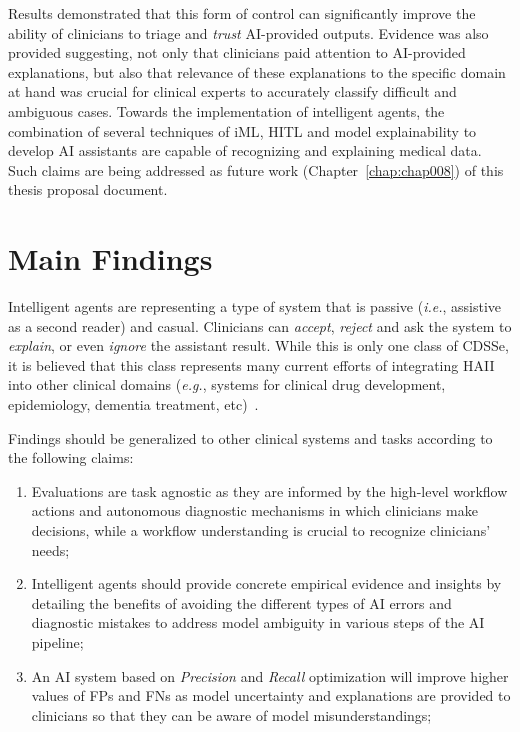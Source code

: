 Results demonstrated that this form of control can significantly improve the ability of clinicians to triage and {\it trust} \ac{AI}-provided outputs.
Evidence was also provided suggesting, not only that clinicians paid attention to \ac{AI}-provided explanations, but also that relevance of these explanations to the specific domain at hand was crucial for clinical experts to accurately classify difficult and ambiguous cases.
Towards the implementation of intelligent agents, the combination of several techniques of \ac{iML}, \ac{HITL} and model explainability to develop \ac{AI} assistants are capable of recognizing and explaining medical data.
Such claims are being addressed as future work (Chapter~\ref{chap:chap008}) of this thesis proposal document.

\section{Main Findings}
\label{sec:sec007003}

Intelligent agents are representing a type of system that is passive ({\it i.e.}, assistive as a second reader) and casual.
Clinicians can {\it accept}, {\it reject} and ask the system to {\it explain}, or even {\it ignore} the assistant result.
While this is only one class of \ac{CDSSe}, it is believed that this class represents many current efforts of integrating \ac{HAII} into other clinical domains ({\it e.g.}, systems for clinical drug development, epidemiology, dementia treatment, etc)~\cite{Savage2019, shah2019artificial, topol2019high}.

\hfill

\noindent
Findings should be generalized to other clinical systems and tasks according to the following claims:

\begin{enumerate}
\item Evaluations are task agnostic as they are informed by the high-level workflow actions and autonomous diagnostic mechanisms in which clinicians make decisions, while a workflow understanding is crucial to recognize clinicians' needs;
\item Intelligent agents should provide concrete empirical evidence and insights by detailing the benefits of avoiding the different types of \ac{AI} errors and diagnostic mistakes to address model ambiguity in various steps of the \ac{AI} pipeline;
\item An \ac{AI} system based on {\it Precision} and {\it Recall} optimization will improve higher values of \acp{FP} and \acp{FN} as model uncertainty and explanations are provided to clinicians so that they can be aware of model misunderstandings;
\end{enumerate}

